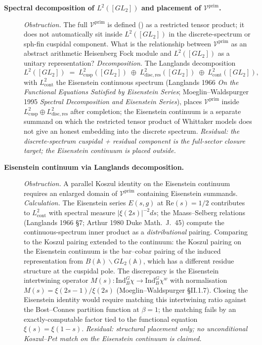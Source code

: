 \begin{description}
\item[\textbf{Spectral decomposition of \(L^{2}([GL_{2}])\) and placement of \(\mathcal{V}^{\mathrm{prim}}\).}]
\emph{Obstruction.} The full \(\mathcal{V}^{\mathrm{prim}}\) is defined
() as a restricted tensor product;
it does not automatically sit inside \(L^{2}([GL_{2}])\) in the
discrete-spectrum or sph-fin cuspidal component. What is the
relationship between \(\mathcal{V}^{\mathrm{prim}}\) as an abstract
arithmetic Heisenberg Fock module and \(L^{2}([GL_{2}])\) as a
unitary representation?
\emph{Decomposition.} The Langlands decomposition
\[
L^{2}([GL_{2}])\;=\;L^{2}_{\mathrm{cusp}}([GL_{2}])\;\oplus\;L^{2}_{\mathrm{disc,res}}([GL_{2}])\;\oplus\;L^{2}_{\mathrm{cont}}([GL_{2}]),
\]
with \(L^{2}_{\mathrm{cont}}\) the Eisenstein continuous spectrum
(Langlands 1966 \emph{On the Functional Equations Satisfied by
Eisenstein Series}; Moeglin--Waldspurger 1995 \emph{Spectral
Decomposition and Eisenstein Series}), places
\(\mathcal{V}^{\mathrm{prim}}\) inside \(L^{2}_{\mathrm{cusp}}\oplus L^{2}_{\mathrm{disc,res}}\)
after completion; the Eisenstein continuum is a separate summand on
which the restricted tensor product of Whittaker models does not
give an honest embedding into the discrete spectrum.
\emph{Residual: the discrete-spectrum cuspidal + residual component
is the full-sector closure target; the Eisenstein continuum is
placed outside.}

\item[\textbf{Eisenstein continuum via Langlands decomposition.}]
\emph{Obstruction.} A parallel Koszul identity on the Eisenstein
continuum requires an enlarged domain of
\(\mathcal{V}^{\mathrm{prim}}\) containing Eisenstein summands.
\emph{Calculation.} The Eisenstein series \(E(s,g)\) at
\(\mathrm{Re}(s)=1/2\) contributes to \(L^{2}_{\mathrm{cont}}\) with
spectral measure \(|\xi(2s)|^{-2}ds\); the Maass--Selberg
relations (Langlands 1966 \S7; Arthur 1980 Duke Math.~J.~45)
compute the continuous-spectrum inner product as a
\emph{distributional} pairing. Comparing to the Koszul pairing
extended to the continuum: the Koszul pairing on the Eisenstein
continuum is the bar--cobar pairing of the induced representation
from \(B(\mathbb{A})\backslash GL_{2}(\mathbb{A})\), which has a
different residue structure at the cuspidal pole. The discrepancy
is the Eisenstein intertwining operator
\(M(s)\colon\mathrm{Ind}_{B}^{G}\chi\to\mathrm{Ind}_{B}^{G}\chi^{w}\)
with normalisation \(M(s)=\xi(2s-1)/\xi(2s)\) (Moeglin--Waldspurger
\S II.1.7). Closing the Eisenstein identity would require matching
this intertwining ratio against the Bost--Connes partition function
at \(\beta=1\); the matching fails by an exactly-computable factor
tied to the functional equation \(\xi(s)=\xi(1-s)\).
\emph{Residual: structural placement only; no unconditional
Koszul--Pet match on the Eisenstein continuum is claimed.}
\end{description}

